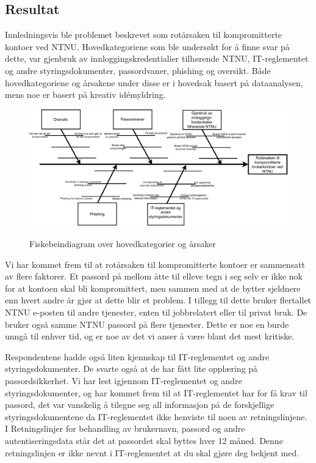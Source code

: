 \subsection{Resultat}
Innledningsvis ble problemet beskrevet som rotårsaken til kompromitterte kontoer ved NTNU. Hovedkategoriene som ble undersøkt for å finne svar på dette, var gjenbruk av innloggingskredentialier tilhørende NTNU, IT-reglementet og andre styringsdokumenter, passordvaner, phishing og oversikt. Både hovedkategoriene og årsakene under disse er i hovedsak basert på dataanalysen, mens noe er basert på kreativ idémyldring. 

\begin{figure}[H]
    \centering
    \includegraphics[scale=1.1, angle=90]{case_2/bilder/fiskebein.pdf}
    \label{fig:fiskebein-case2}
    \caption[Fiskebein-case2]{Fiskebeindiagram over hovedkategorier og årsaker}
\end{figure}

Vi har kommet frem til at rotårsaken til kompromitterte kontoer er sammensatt av flere faktorer. Et passord på mellom åtte til elleve tegn i seg selv er ikke nok for at kontoen skal bli kompromittert, men sammen med at de bytter sjeldnere enn hvert andre år gjør at dette blir et problem. I tillegg til dette bruker flertallet NTNU e-posten til andre tjenester, enten til jobbrelatert eller til privat bruk. De bruker også samme NTNU passord på flere tjenester. Dette er noe en burde unngå til enhver tid, og er noe av det vi anser å være blant det mest kritiske. 

Respondentene hadde også liten kjennskap til IT-reglementet og andre styringsdokumenter. De svarte også at de har fått lite opplæring på passordsikkerhet. Vi har lest igjennom IT-reglementet og andre styringsdokumenter, og har kommet frem til at IT-reglementet har for få krav til passord, det var vanskelig å tilegne seg all informasjon på de forskjellige styringsdokumentene da IT-reglementet ikke henviste til noen av retningslinjene. I Retningslinjer for behandling av brukernavn, passord og andre autentiseringsdata \cite{RetnBPA} står det at passordet skal byttes hver 12 måned. Denne retningslinjen er ikke nevnt i IT-reglementet at du skal gjøre deg bekjent med. 

